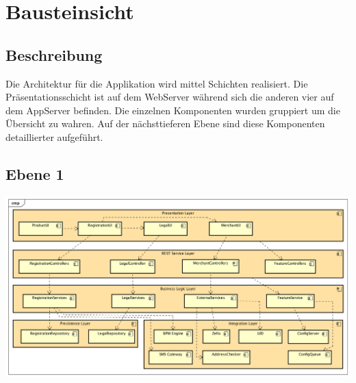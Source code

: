\graphicspath{{./images/}}

\chapter{Bausteinsicht}

\section{Beschreibung}

Die Architektur für die Applikation wird mittel Schichten realisiert. Die Präsentationsschicht ist auf dem WebServer während sich die anderen vier auf dem AppServer befinden. Die einzelnen Komponenten wurden gruppiert um die Übersicht zu wahren. Auf der nächsttieferen Ebene sind diese Komponenten detaillierter aufgeführt.

\begin{landscape}
\section{Ebene 1}

\begin{center}
	\includegraphics[scale=0.6]{ComponentLevel1.png}
\end{center}

\end{landscape}
\restoregeometry


